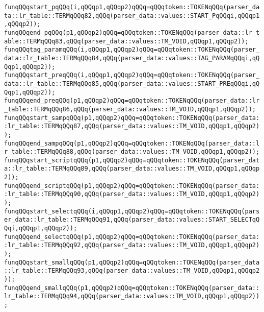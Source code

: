\verb|funqQQqstart_pqQQq(i,qQQqp1,qQQqp2)qQQq=qQQqtoken::TOKENqQQq(parser_data::lr_table::TERMqQQq82,qQQq(parser_data::values::START_PqQQqi,qQQqp1,qQQqp2));|\newline
\verb|funqQQqend_pqQQq(p1,qQQqp2)qQQq=qQQqtoken::TOKENqQQq(parser_data::lr_table::TERMqQQq83,qQQq(parser_data::values::TM_VOID,qQQqp1,qQQqp2));|\newline
\verb|funqQQqtag_paramqQQq(i,qQQqp1,qQQqp2)qQQq=qQQqtoken::TOKENqQQq(parser_data::lr_table::TERMqQQq84,qQQq(parser_data::values::TAG_PARAMqQQqi,qQQqp1,qQQqp2));|\newline
\verb|funqQQqstart_preqQQq(i,qQQqp1,qQQqp2)qQQq=qQQqtoken::TOKENqQQq(parser_data::lr_table::TERMqQQq85,qQQq(parser_data::values::START_PREqQQqi,qQQqp1,qQQqp2));|\newline
\verb|funqQQqend_preqQQq(p1,qQQqp2)qQQq=qQQqtoken::TOKENqQQq(parser_data::lr_table::TERMqQQq86,qQQq(parser_data::values::TM_VOID,qQQqp1,qQQqp2));|\newline
\verb|funqQQqstart_sampqQQq(p1,qQQqp2)qQQq=qQQqtoken::TOKENqQQq(parser_data::lr_table::TERMqQQq87,qQQq(parser_data::values::TM_VOID,qQQqp1,qQQqp2));|\newline
\verb|funqQQqend_sampqQQq(p1,qQQqp2)qQQq=qQQqtoken::TOKENqQQq(parser_data::lr_table::TERMqQQq88,qQQq(parser_data::values::TM_VOID,qQQqp1,qQQqp2));|\newline
\verb|funqQQqstart_scriptqQQq(p1,qQQqp2)qQQq=qQQqtoken::TOKENqQQq(parser_data::lr_table::TERMqQQq89,qQQq(parser_data::values::TM_VOID,qQQqp1,qQQqp2));|\newline
\verb|funqQQqend_scriptqQQq(p1,qQQqp2)qQQq=qQQqtoken::TOKENqQQq(parser_data::lr_table::TERMqQQq90,qQQq(parser_data::values::TM_VOID,qQQqp1,qQQqp2));|\newline
\verb|funqQQqstart_selectqQQq(i,qQQqp1,qQQqp2)qQQq=qQQqtoken::TOKENqQQq(parser_data::lr_table::TERMqQQq91,qQQq(parser_data::values::START_SELECTqQQqi,qQQqp1,qQQqp2));|\newline
\verb|funqQQqend_selectqQQq(p1,qQQqp2)qQQq=qQQqtoken::TOKENqQQq(parser_data::lr_table::TERMqQQq92,qQQq(parser_data::values::TM_VOID,qQQqp1,qQQqp2));|\newline
\verb|funqQQqstart_smallqQQq(p1,qQQqp2)qQQq=qQQqtoken::TOKENqQQq(parser_data::lr_table::TERMqQQq93,qQQq(parser_data::values::TM_VOID,qQQqp1,qQQqp2));|\newline
\verb|funqQQqend_smallqQQq(p1,qQQqp2)qQQq=qQQqtoken::TOKENqQQq(parser_data::lr_table::TERMqQQq94,qQQq(parser_data::values::TM_VOID,qQQqp1,qQQqp2));|\newline
